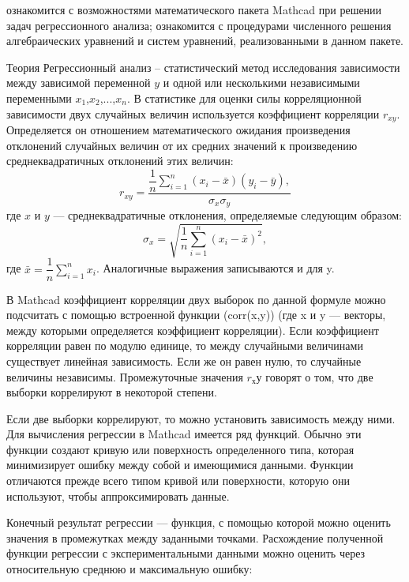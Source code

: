 
\goal ознакомится с возможностями математического пакета Mathcad при решении задач регрессионного анализа; ознакомится с процедурами численного решения алгебраических уравнений и систем уравнений, реализованными в данном пакете. 

Теория
Регрессионный анализ – статистический метод исследования зависимости между зависимой переменной $y$ и одной или несколькими независимыми переменными $x_1$,$x_2$,...,$x_n$.
В статистике для оценки силы корреляционной зависимости двух случайных величин используется коэффициент корреляции $r_{xy}$. Определяется он отношением математического ожидания произведения отклонений случайных величин от их средних значений к произведению среднеквадратичных отклонений этих величин:
\begin{equation}
	r_{xy}=\dfrac{\dfrac{1}{n} \sum\limits_{i=1}^{n} (x_i-\bar{x}) (y_i-\bar{y}), }{\sigma_x \sigma_y}
\end{equation}
где $x$ и $y$ --- среднеквадратичные отклонения, определяемые следующим образом:
\begin{equation}
	\sigma_x=\sqrt{\dfrac{1}{n} \sum\limits_{i=1}^{n}(x_i-\bar{x})^2},
\end{equation}
где $\bar{x}=\dfrac{1}{n} \sum\limits_{i=1}^{n} x_i$.
Аналогичные выражения записываются и для y.

В Mathcad коэффициент корреляции двух выборок по данной формуле можно подсчитать с помощью встроенной функции \mc(corr(x,y)) (где x и y --- векторы, между которыми определяется коэффициент корреляции). Если коэффициент корреляции равен по модулю единице, то между случайными величинами существует линейная зависимость. Если же он равен нулю, то случайные величины независимы. Промежуточные значения $r_ху$ говорят о том, что две выборки коррелируют в некоторой степени.

Если две выборки коррелируют, то можно установить зависимость между ними. Для вычисления регрессии в Mathcad имеется ряд функций. Обычно эти функции создают кривую или поверхность определенного типа, которая минимизирует ошибку между собой и имеющимися данными. Функции отличаются прежде всего типом кривой или поверхности, которую они используют, чтобы аппроксимировать данные.

Конечный результат регрессии --- функция, с помощью которой можно оценить значения в промежутках между заданными точками. Расхождение полученной функции регрессии с экспериментальными данными можно оценить через относительную среднюю и максимальную ошибку:

